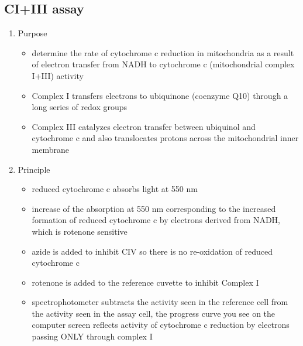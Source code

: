 \documentclass{scrartcl}
\begin{document}
\subsection{CI+III assay}
\label{sec:org0fc424f}
\begin{enumerate}
\item Purpose
\label{sec:orgaeb6ce3}
\begin{itemize}
\item determine the rate of cytochrome c reduction in mitochondria as a
result of electron transfer from NADH to cytochrome c (mitochondrial
complex I+III) activity
\item Complex I transfers electrons to ubiquinone (coenzyme Q10) through a
long series of redox groups
\item Complex III catalyzes electron transfer between ubiquinol and
cytochrome c and also translocates protons across the mitochondrial
inner membrane
\end{itemize}

\item Principle
\label{sec:org95d19b7}
\begin{itemize}
\item reduced cytochrome c absorbs light at 550 nm
\item increase of the absorption at 550 nm corresponding to the increased
formation of reduced cytochrome c by electrons derived from NADH,
which is rotenone sensitive
\item azide is added to inhibit CIV so there is no re-oxidation of reduced cytochrome c
\item rotenone is added to the reference cuvette to inhibit Complex I
\end{itemize}

{\small{}}

\begin{itemize}
\item spectrophotometer subtracts the activity seen in the reference cell
from the activity seen in the assay cell, the progress curve you see
on the computer screen reflects activity of cytochrome c reduction
by electrons passing ONLY through complex I
\end{itemize}
\end{enumerate}
\end{document}
